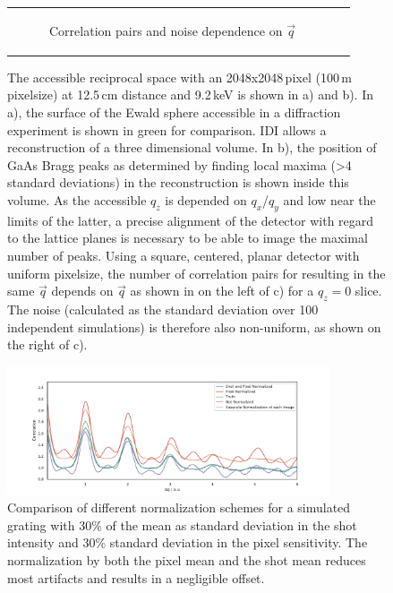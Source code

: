 \begin{figure}
\begin{tabular}[t]{cc}
\begin{subfigure}{0.52\textwidth}
			\caption{Correlation pairs and noise dependence on $\vec{q}$ } 
			\label{fig:pairnoise}
		\end{subfigure}\\
	\end{tabular}
	\caption[Accessible reciprocal space]{The accessible reciprocal space with an 2048x2048\,pixel (100\,\textmu m pixelsize) at 12.5\,cm distance and 9.2\,keV is shown in a) and b). In a), the surface of the Ewald sphere accessible in a diffraction experiment is shown in green for comparison. IDI allows a reconstruction of a three dimensional volume. In b), the position of GaAs Bragg peaks as determined by finding local maxima (>4 standard deviations) in the reconstruction is shown inside this volume. As the accessible $q_z$ is depended on $q_x$/$q_y$ and low near the limits of the latter, a precise alignment of the detector with regard to the lattice planes is necessary to be able to image the maximal number of peaks. Using a square, centered, planar detector with uniform pixelsize, the number of correlation pairs for resulting in the same $\vec{q}$ depends on $\vec{q}$ as shown in on the left of c) for a $q_z=0$ slice. The noise (calculated as the standard deviation over 100 independent simulations) is therefore also non-uniform, as shown on the right of c).}
	
\end{figure}

\begin{figure}
	\centering
	\includegraphics[width=0.85\textwidth]{images/normalisation_comp.pdf}
	\caption[Comparison of Normalization Techniques]{Comparison of different normalization schemes for a simulated grating with 30\% of the mean as standard deviation in the shot intensity and 30\% standard deviation in the pixel sensitivity. The normalization by both the pixel mean and the shot mean reduces most artifacts and results in a negligible offset.}
	\label{fig:norm_com}
\end{figure}


